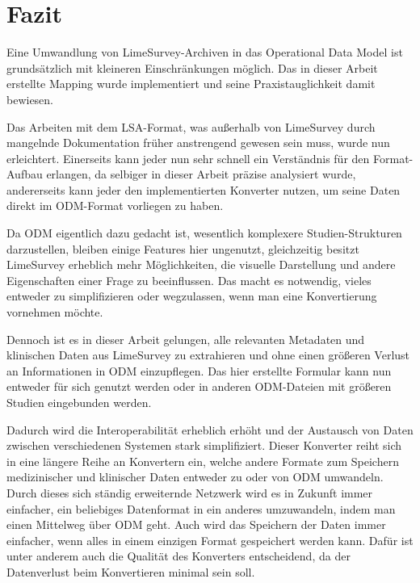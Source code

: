 \chapter{Fazit}
\label{ch:fazit}


Eine Umwandlung von LimeSurvey-Archiven in das Operational Data Model ist grundsätzlich mit kleineren Einschränkungen möglich.
Das in dieser Arbeit erstellte Mapping wurde implementiert und seine Praxistauglichkeit damit bewiesen.

Das Arbeiten mit dem LSA-Format, was außerhalb von LimeSurvey durch mangelnde Dokumentation früher anstrengend gewesen sein muss, wurde nun erleichtert.
Einerseits kann jeder nun sehr schnell ein Verständnis für den Format-Aufbau erlangen, da selbiger in dieser Arbeit präzise analysiert wurde, andererseits kann jeder den implementierten Konverter nutzen, um seine Daten direkt im ODM-Format vorliegen zu haben.

Da ODM eigentlich dazu gedacht ist, wesentlich komplexere Studien-Strukturen darzustellen, bleiben einige Features hier ungenutzt, 
gleichzeitig besitzt LimeSurvey erheblich mehr Möglichkeiten, die visuelle Darstellung und andere Eigenschaften einer Frage zu beeinflussen.
Das macht es notwendig, vieles entweder zu simplifizieren oder wegzulassen, wenn man eine Konvertierung vornehmen möchte.

Dennoch ist es in dieser Arbeit gelungen, alle relevanten Metadaten und klinischen Daten aus LimeSurvey zu extrahieren und ohne einen größeren Verlust an Informationen in ODM einzupflegen.
Das hier erstellte Formular kann nun entweder für sich genutzt werden oder in anderen ODM-Dateien mit größeren Studien eingebunden werden.

Dadurch wird die Interoperabilität erheblich erhöht und der Austausch von Daten zwischen verschiedenen Systemen stark simplifiziert.
Dieser Konverter reiht sich in eine längere Reihe an Konvertern ein, welche andere Formate zum Speichern medizinischer und klinischer Daten entweder zu oder von ODM umwandeln.
Durch dieses sich ständig erweiternde Netzwerk wird es in Zukunft immer einfacher, ein beliebiges Datenformat in ein anderes umzuwandeln, indem man einen Mittelweg über ODM geht.
Auch wird das Speichern der Daten immer einfacher, wenn alles in einem einzigen Format gespeichert werden kann.
Dafür ist unter anderem auch die Qualität des Konverters entscheidend, da der Datenverlust beim Konvertieren minimal sein soll.

